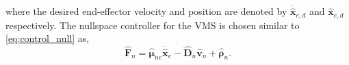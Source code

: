 \documentclass[../main.tex]{subfiles}
\begin{document}
where the desired end-effector velocity and position are denoted by $\dot{\hat{\bm{x}}}_{e,d}$  and ${\hat{\bm{x}}}_{e,d}$ respectively. The nullspace controller for the VMS is chosen similar to \eqref{eq:control_null} as,
\begin{equation}
    \label{eq:control_null_vms}
    \hat{\bm{F}}_n = \hat{\bm{\mu}}_{ne} \dot{\hat{{{\bm{x}}}}}_e
    - \hat{\bm{D}}_n \hat{\bm{v}}_n
    + \hat{\bm{\rho}}_n.
\end{equation}
\end{document}
